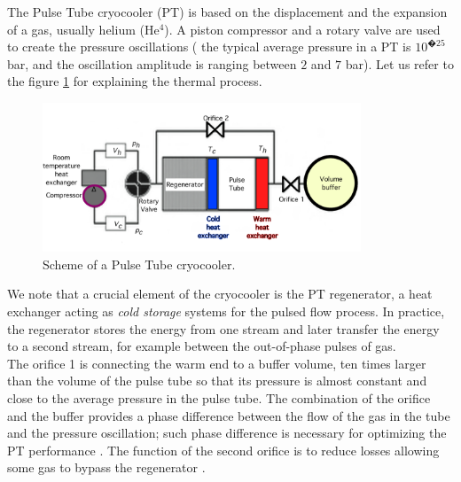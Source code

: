 \FloatBarrier
{} {The Pulse Tube cryocooler (PT) is based on the displacement and the expansion of a gas, usually helium (He$^4$).  A piston compressor and a rotary valve  are used to create the pressure oscillations ( the typical average pressure in a PT is $10^{�25}$ bar, and the oscillation amplitude is ranging between $2$ and  $7$ bar). Let us refer to the figure \ref{fig:PT_scheme} for explaining the thermal process.
\begin{figure}[H]
	\begin{center}
		\includegraphics[width=9.5cm]{./Sec_SiteInfra/Figures/PT_scheme.pdf}
		\caption{Scheme of a Pulse Tube cryocooler.}
		\label{fig:PT_scheme}
	\end{center}
\end{figure}
We note that  a crucial element of the cryocooler is the  PT regenerator,  a heat exchanger acting as {\it cold storage} systems for the  pulsed flow process.   In practice, the regenerator  stores the energy from one stream and later transfer the energy to a second stream, for example between the out-of-phase pulses of gas. \\
The orifice 1  is connecting  the warm end  to a buffer volume, ten times larger than the volume of the pulse tube so that its pressure is almost constant and close to the average pressure in the pulse tube. The combination of the orifice and the buffer provides a phase difference between the flow of the gas in the tube and the pressure oscillation; such phase difference is necessary for optimizing the PT performance \cite{Mikulin}. The function of the second orifice  is to reduce losses allowing some gas to bypass the regenerator \cite{Zhu} .
}
